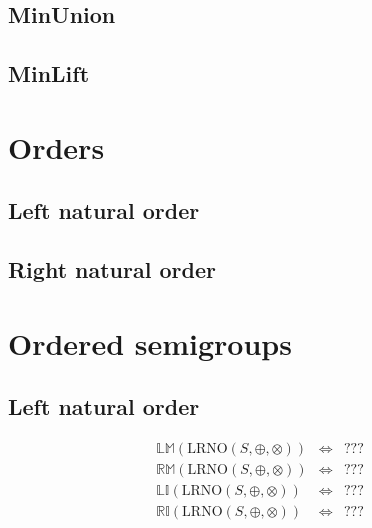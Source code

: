 \documentclass[10pt]{report}
\newcommand{\propname}[1]{{\mathbb{#1}}}
\begin{document}
\subsection{MinUnion} 




\subsection{MinLift} 






\section{Orders}

\subsection{Left natural order}



\subsection{Right natural order}




\section{Ordered semigroups}

\subsection{Left natural order}

\[
\begin{array}{rcl} 
\propname{LM}(\mathrm{LRNO}(S,\oplus,\otimes))
    & \Leftrightarrow %
    & ??? \\
\propname{RM}(\mathrm{LRNO}(S,\oplus,\otimes))
    & \Leftrightarrow %
    & ??? \\
\propname{LI}(\mathrm{LRNO}(S,\oplus,\otimes))
    & \Leftrightarrow %
    & ??? \\ 
\propname{RI}(\mathrm{LRNO}(S,\oplus,\otimes))
    & \Leftrightarrow %
    & ??? \\
\end{array} 
\] 
\end{document}
